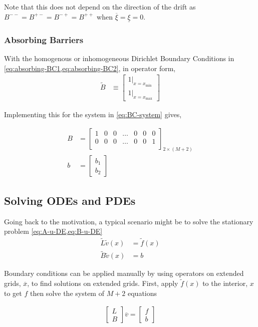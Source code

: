 \documentclass[11pt]{article}
\theoremstyle{definition}
\begin{document}
Note that this does not depend on the direction of the drift as $B^{--} = B^{+-} = B^{-+} = B^{++}$ when $\overline{\xi} = \underline{\xi} = 0$.

	\subsubsection{Absorbing Barriers}

With the homogenous or inhomogeneous Dirichlet Boundary Conditions in \cref{eq:absorbing-BC1,eq:absorbing-BC2}, in operator form,
\begin{align}
	\tilde{B} &\equiv \begin{bmatrix}
	1 \vert_{x = x_{\min}}\\
	1 \vert_{x = x_{\max}}
	\end{bmatrix}
\end{align}

Implementing this for the system in \cref{eq:BC-system} gives,

\begin{align}
B &= \begin{bmatrix}
1 & 0 & 0 & \dots & 0 & 0 & 0 \\
0 & 0 & 0 & \dots & 0 & 0 & 1\\
\end{bmatrix}_{2 \times (M+2)}\label{eq:absorbing-barrier-matrix-regular}\\
b &= \begin{bmatrix}
b_1 \\
b_2
\end{bmatrix}
\end{align}

\subsection{Solving ODEs and PDEs}
Going back to the motivation, a typical scenario might be to solve the stationary problem \cref{eq:A-u-DE,eq:B-u-DE}
\begin{align}
	\tilde{L} \tilde{v}(x) &= \tilde{f}(x)\\
	\tilde{B} \tilde{v}(x) &= b
\end{align}

Boundary conditions can be applied manually by using operators on extended grids, $\overline{x}$, to find solutions on extended grids.  First, apply $\tilde{f}(x)$ to the interior, $x$ to get  $f$ then solve the system of $M+2$ equations

\begin{align}
\begin{bmatrix}
L \\
B
\end{bmatrix}
\overline{v} =
\begin{bmatrix}
f \\
b
\end{bmatrix}\label{eq:reflecting-barrier-extended-system}
\end{align}
\end{document}
